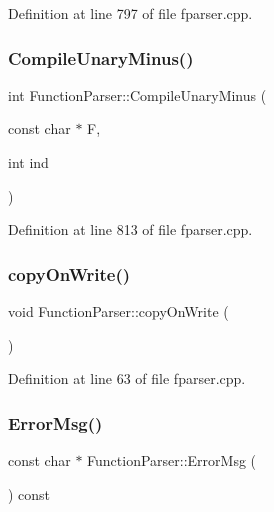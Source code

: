 Definition at line 797 of file fparser.\+cpp.

\mbox{\label{class_function_parser_adda1df6bf29a91d38e838bdf96524f61}} 
\subsubsection{\texorpdfstring{Compile\+Unary\+Minus()}{CompileUnaryMinus()}}
{\footnotesize\ttfamily int Function\+Parser\+::\+Compile\+Unary\+Minus (\begin{DoxyParamCaption}\item[{const char $\ast$}]{F,  }\item[{int}]{ind }\end{DoxyParamCaption})\hspace{0.3cm}{\ttfamily [private]}}



Definition at line 813 of file fparser.\+cpp.

\mbox{\label{class_function_parser_a0af0f9ad348adf7df57fa630eddf8e47}} 
\subsubsection{\texorpdfstring{copy\+On\+Write()}{copyOnWrite()}}
{\footnotesize\ttfamily void Function\+Parser\+::copy\+On\+Write (\begin{DoxyParamCaption}{ }\end{DoxyParamCaption})\hspace{0.3cm}{\ttfamily [private]}}



Definition at line 63 of file fparser.\+cpp.

\mbox{\label{class_function_parser_a000e3edaf5dc8ee121df03b731ff0192}} 
\subsubsection{\texorpdfstring{Error\+Msg()}{ErrorMsg()}}
{\footnotesize\ttfamily const char $\ast$ Function\+Parser\+::\+Error\+Msg (\begin{DoxyParamCaption}{ }\end{DoxyParamCaption}) const}



